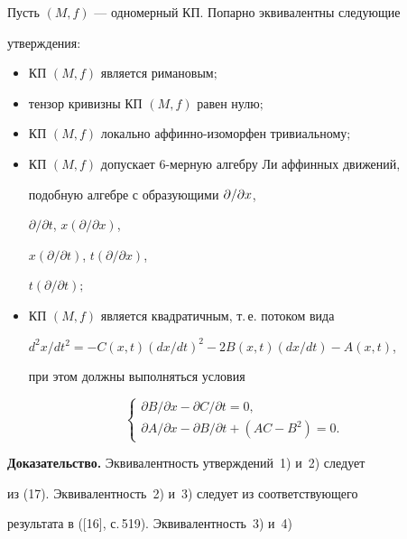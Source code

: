 \begin{thm}


Пусть $(M,f) $ --- одномерный КП. Попарно эквивалентны следующие


утверждения\/${:}$


\begin{itemize}


\item[1)] КП $(M,f) $ является римановым\/$;$


\item[2)] тензор кривизны КП $(M,f) $ равен нулю\/$;$


\item[3)] КП $(M,f) $ локально аффинно-изоморфен тривиальному\/$;$


\item[4)] КП $(M,f) $ допускает $6$-мерную алгебру Ли аффинных движений,


подобную алгебре с образующими $\displaystyle \partial/\partial x$,


$\partial/\partial t$, $x(\partial/\partial x)$,


$x(\partial/\partial t)$, $t(\partial/\partial x)$,


$t(\partial/\partial t);$


\item[5)] КП $(M,f) $ является квадратичным, т.\,е. потоком вида


$d^2x/dt^2=-C(x,t)(dx/dt)^2-2B(x,t)(dx/dt)-A(x,t)$,


при этом должны выполняться условия


\end{itemize}


$$


\begin{cases}


\partial B/\partial x-\partial C/\partial t=0,\\


\partial A/\partial x-\partial B/\partial t+(AC-B^2)=0.


\end{cases}


$$


\end{thm}





{\bf Доказательство.} Эквивалентность утверждений~1) и~2) следует


из (17). Эквивалентность~2) и~3) следует из соответствующего


результата в ([16], с.\,519). Эквивалентность~3) и~4)


